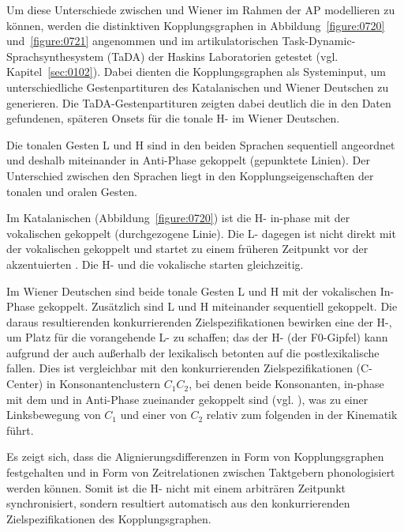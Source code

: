 \largerpage
Um diese Unterschiede zwischen  und Wiener  im Rahmen der AP modellieren zu können, werden die distinktiven Kopplungsgraphen in Abbildung~\ref{figure:0720} und~\ref{figure:0721} angenommen und im artikulatorischen Task-Dynamic-Sprachsynthesystem (TaDA) der Haskins Laboratorien \citep{Nam2004} getestet (vgl. Kapitel~\ref{sec:0102}). Dabei dienten die Kopplungsgraphen als Systeminput, um unterschiedliche Gestenpartituren des Katalanischen und Wiener Deutschen zu generieren. Die TaDA-Gestenpartituren zeigten dabei deutlich die in den Daten gefundenen, späteren Onsets für die tonale H- im Wiener Deutschen.


Die tonalen Gesten L und H sind in den beiden Sprachen sequentiell angeordnet und deshalb miteinander in Anti-Phase gekoppelt (gepunktete Linien). Der Unterschied zwischen den Sprachen liegt in den Kopplungseigenschaften der tonalen und oralen Gesten.


Im Katalanischen (Abbildung~\ref{figure:0720}) ist die H- in-phase mit der vokalischen  gekoppelt (durchgezogene Linie). Die L- dagegen ist nicht direkt mit der vokalischen  gekoppelt und startet zu einem früheren Zeitpunkt vor der akzentuierten . Die H- und die vokalische  starten gleichzeitig.


Im Wiener Deutschen sind beide tonale Gesten L und H mit der vokalischen  In-Phase gekoppelt. Zusätzlich sind L und H miteinander sequentiell gekoppelt. Die daraus resultierenden konkurrierenden Zielspezifikationen bewirken eine  der H-, um Platz für die vorangehende L- zu schaffen; das  der H- (der F0-Gipfel) kann aufgrund der  auch außerhalb der lexikalisch betonten  auf die postlexikalische  fallen. Dies  ist vergleichbar mit den konkurrierenden Zielspezifikationen (C-Center) in Konsonantenclustern ${C}_{1}{C}_{2}$, bei denen beide Konsonanten, in-phase mit dem  und in Anti-Phase zueinander gekoppelt sind (vgl. \citealt{Browman1989,Browman2000,Nam2003,Nam2007a,Goldstein2009,Marin2008,Hermes2013}), was zu einer Linksbewegung von ${C}_{1}$ und einer  von ${C}_{2}$ relativ zum folgenden  in der Kinematik führt.

Es zeigt sich, dass die Alignierungsdifferenzen in Form von Kopplungsgraphen festgehalten und in Form von Zeitrelationen zwischen Taktgebern phonologisiert werden können. Somit ist die H- nicht mit einem arbiträren Zeitpunkt synchronisiert, sondern resultiert automatisch aus den konkurrierenden Zielspezifikationen des Kopplungsgraphen.


